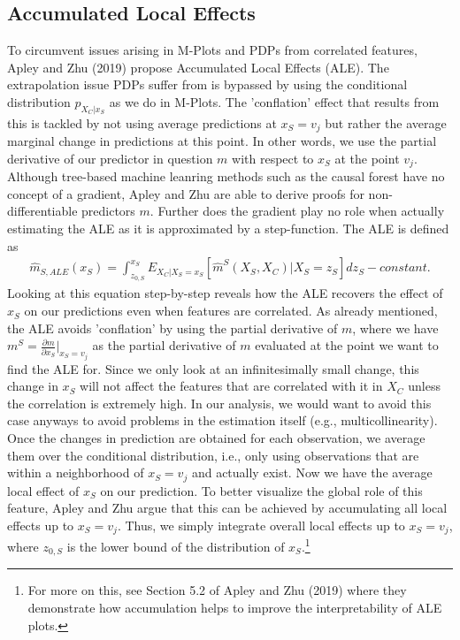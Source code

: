 \subsection{Accumulated Local Effects}
To circumvent issues arising in M-Plots and PDPs from correlated features, Apley and Zhu (2019) propose Accumulated Local Effects (ALE). The extrapolation issue PDPs suffer from is bypassed by using the conditional distribution $p_{X_C|x_S}$ as we do in M-Plots. The 'conflation' effect that results from this is tackled by not using average predictions at $x_S=v_j$ but rather the average marginal change in predictions at this point. In other words, we use the partial derivative of our predictor in question $m$ with respect to $x_S$ at the point $v_j$. Although tree-based machine leanring methods such as the causal forest have no concept of a gradient, Apley and Zhu are able to derive proofs for non-differentiable predictors $m$. Further does the gradient play no role when actually estimating the ALE as it is approximated by a step-function. The ALE is defined as
\begin{align}
\hat{m}_{S, ALE} (x_S)=\int_{z_{0, S}}^{x_S} E_{X_C|X_S=x_S}[\hat{m}^S(X_S, X_C)|X_S=z_S]dz_S - constant. \label{eq:ale}
\end{align}
Looking at this equation step-by-step reveals how the ALE recovers the effect of $x_S$ on our predictions even when features are correlated. As already mentioned, the ALE avoids 'conflation' by using the partial derivative of $m$, where we have $m^S=\frac{\partial m}{\partial x_S}\rvert_{x_S=v_j}$ as the partial derivative of $m$ evaluated at the point we want to find the ALE for. Since we only look at an infinitesimally small change, this change in $x_S$ will not affect the features that are correlated with it in $X_C$ unless the correlation is extremely high. In our analysis, we would want to avoid this case anyways to avoid problems in the estimation itself (e.g., multicollinearity). Once the changes in prediction are obtained for each observation, we average them over the conditional distribution, i.e., only using observations that are within a neighborhood of $x_S=v_j$ and actually exist. Now we have the average local effect of $x_S$ on our prediction. To better visualize the global role of this feature, Apley and Zhu argue that this can be achieved by accumulating all local effects up to $x_S=v_j$. Thus, we simply integrate overall local effects up to $x_S=v_j$, where $z_{0, S}$ is the lower bound of the distribution of $x_S$.\footnote{For more on this, see Section 5.2 of Apley and Zhu (2019) where they demonstrate how accumulation helps to improve the interpretability of ALE plots.} \\
